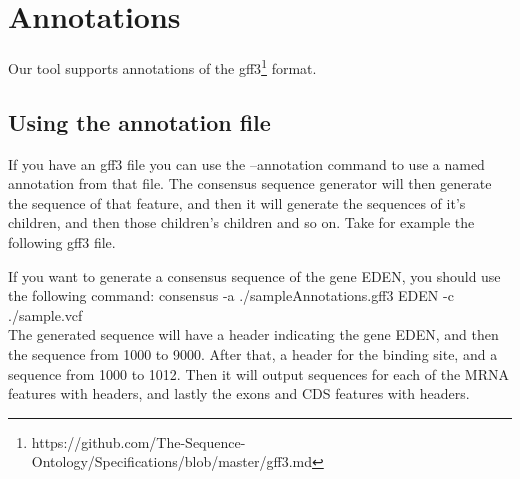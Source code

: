 \section{Annotations}\label{sec:Annotations}
Our tool supports annotations of the gff3\footnote{https://github.com/The-Sequence-Ontology/Specifications/blob/master/gff3.md} format.

\subsection{Using the annotation file}
If you have an gff3 file you can use the --annotation command to  use a named annotation from that file. The consensus sequence generator will then generate the sequence of that feature, and then it will generate the sequences of it's children, and then those children's children and so on. Take for example the following gff3 file.

If you want to generate a consensus sequence of the gene EDEN, you should use the following command:
consensus -a ./sampleAnnotations.gff3 EDEN -c ./sample.vcf \\
The generated sequence will have a header indicating the gene EDEN, and then the sequence from 1000 to 9000. After that, a header for the  binding site, and a sequence from 1000 to 1012. Then it will output sequences for each of the MRNA features with headers, and lastly the exons and CDS features with headers.